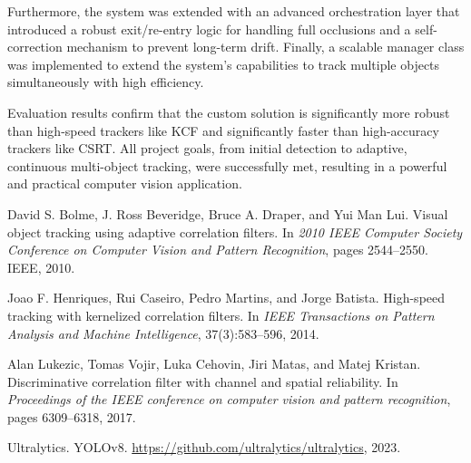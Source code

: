 \documentclass[12pt, a4paper]{article}
\begin{document}
Furthermore, the system was extended with an advanced orchestration layer that introduced a robust exit/re-entry logic for handling full occlusions and a self-correction mechanism to prevent long-term drift. Finally, a scalable manager class was implemented to extend the system's capabilities to track multiple objects simultaneously with high efficiency.

Evaluation results confirm that the custom solution is significantly more robust than high-speed trackers like KCF and significantly faster than high-accuracy trackers like CSRT. All project goals, from initial detection to adaptive, continuous multi-object tracking, were successfully met, resulting in a powerful and practical computer vision application.

\begin{thebibliography}{9}

David S. Bolme, J. Ross Beveridge, Bruce A. Draper, and Yui Man Lui.
\newblock Visual object tracking using adaptive correlation filters.
\newblock In \emph{2010 IEEE Computer Society Conference on Computer Vision and Pattern Recognition}, pages 2544--2550. IEEE, 2010.

Joao F. Henriques, Rui Caseiro, Pedro Martins, and Jorge Batista.
\newblock High-speed tracking with kernelized correlation filters.
\newblock In \emph{IEEE Transactions on Pattern Analysis and Machine Intelligence}, 37(3):583--596, 2014.

Alan Lukezic, Tomas Vojir, Luka Cehovin, Jiri Matas, and Matej Kristan.
\newblock Discriminative correlation filter with channel and spatial reliability.
\newblock In \emph{Proceedings of the IEEE conference on computer vision and pattern recognition}, pages 6309--6318, 2017.
 
Ultralytics.
\newblock YOLOv8.
\newblock \url{https://github.com/ultralytics/ultralytics}, 2023.

\end{thebibliography}


\end{document}
